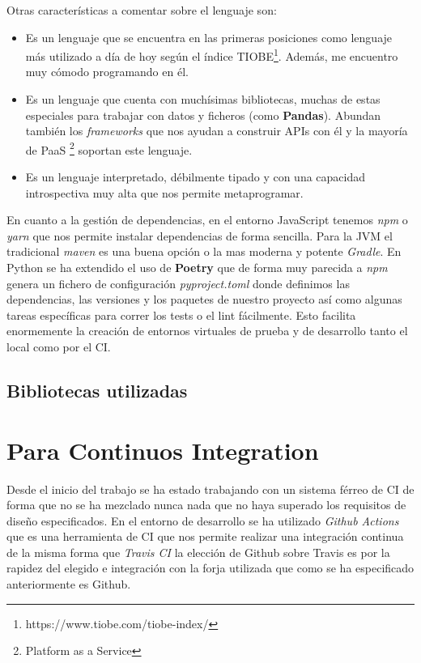 Otras características a comentar sobre el lenguaje son:
\begin{itemize}
    \item Es un lenguaje que se encuentra en las primeras posiciones como lenguaje más utilizado a día de hoy según el índice TIOBE\footnote{https://www.tiobe.com/tiobe-index/}. Además, me encuentro muy cómodo programando en él.
    \item Es un lenguaje que cuenta con muchísimas bibliotecas, muchas de estas especiales para trabajar con datos y ficheros (como \textbf{Pandas}). Abundan también los \textit{frameworks} que nos ayudan a construir APIs con él y la mayoría de PaaS \footnote{Platform as a Service} soportan este lenguaje.
    \item Es un lenguaje interpretado, débilmente tipado y con una capacidad introspectiva muy alta que nos permite metaprogramar.
\end{itemize}

En cuanto a la gestión de dependencias, en el entorno JavaScript tenemos \textit{npm} o \textit{yarn} que nos permite
instalar dependencias de forma sencilla. Para la JVM el tradicional \textit{maven} es una buena opción o la mas moderna
y potente \textit{Gradle}. En Python se ha extendido el uso de \textbf{Poetry} que de forma muy parecida a \textit{npm}
genera un fichero de configuración \textit{pyproject.toml} donde definimos las dependencias, las versiones y los paquetes
de nuestro proyecto así como algunas tareas específicas para correr los tests o el lint fácilmente. Esto facilita
enormemente la creación de entornos virtuales de prueba y de desarrollo tanto el local como por el CI.

\subsection{Bibliotecas utilizadas}

\section{Para Continuos Integration}
Desde el inicio del trabajo se ha estado trabajando con un sistema férreo de CI de forma que no se ha mezclado nunca nada que no haya superado los requisitos de diseño especificados. En el entorno de desarrollo se ha utilizado \textit{Github Actions} que es una herramienta de CI que nos permite realizar una integración continua de la misma forma que \textit{Travis CI} la elección de Github sobre Travis es por la rapidez del elegido e integración con la forja utilizada que como se ha especificado anteriormente es Github.

